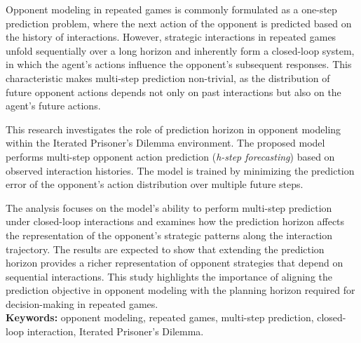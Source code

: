 \abstracteng
Opponent modeling in repeated games is commonly formulated as a one-step prediction problem, where the next action of the opponent is predicted based on the history of interactions. However, strategic interactions in repeated games unfold sequentially over a long horizon and inherently form a closed-loop system, in which the agent's actions influence the opponent's subsequent responses. This characteristic makes multi-step prediction non-trivial, as the distribution of future opponent actions depends not only on past interactions but also on the agent's future actions.

This research investigates the role of prediction horizon in opponent modeling within the Iterated Prisoner's Dilemma environment. The proposed model performs multi-step opponent action prediction (\textit{h-step forecasting}) based on observed interaction histories. The model is trained by minimizing the prediction error of the opponent's action distribution over multiple future steps.

The analysis focuses on the model's ability to perform multi-step prediction under closed-loop interactions and examines how the prediction horizon affects the representation of the opponent's strategic patterns along the interaction trajectory. The results are expected to show that extending the prediction horizon provides a richer representation of opponent strategies that depend on sequential interactions. This study highlights the importance of aligning the prediction objective in opponent modeling with the planning horizon required for decision-making in repeated games.\\

\noindent\textbf{Keywords:} opponent modeling, repeated games, multi-step prediction, closed-loop interaction, Iterated Prisoner's Dilemma.
\endabstracteng




